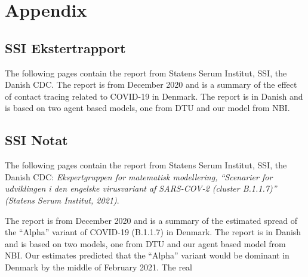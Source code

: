 \part*{Appendix}
\appendix

\chapter{SSI Ekstertrapport}

The following pages contain the report from Statens Serum Institut, SSI, the Danish CDC.
The report is from December 2020 and is a summary of the effect of contact tracing related to COVID-19 in Denmark. The report is in Danish and is based on two agent based models, one from DTU and our model from NBI.

\clearpage



\chapter{SSI Notat}


The following pages contain the report from Statens Serum Institut, SSI, the Danish CDC: \emph{Ekspertgruppen for matematisk modellering, “Scenarier for udviklingen i den engelske
virusvariant af SARS-COV-2 (cluster B.1.1.7)” (Statens Serum Institut, 2021)}.

The report is from December 2020 and is a summary of the estimated spread of the ``Alpha'' variant of COVID-19 (B.1.1.7) in Denmark. The report is in Danish and is based on two models, one from DTU and our agent based model from NBI. Our estimates predicted that the ``Alpha'' variant would be dominant in Denmark by the middle of February 2021. The real

\clearpage

